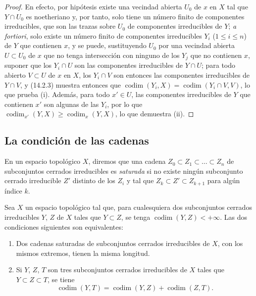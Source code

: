 \begin{proof}
En efecto, por hipótesis existe una vecindad abierta $U_0$ de $x$ en $X$ tal
que $Y\cap U_0$ es noetheriano y, por tanto, solo tiene un número finito de
componentes irreducibles, que son las trazas sobre $U_0$ de componentes
irreducibles de $Y$; \emph{a fortiori}, solo existe un número finito de
componentes irreducibles $Y_i$ ($1\leq i\leq n$) de $Y$ que contienen $x$, y
se puede, sustituyendo $U_0$ por una vecindad abierta $U\subset U_0$ de $x$ que
no tenga intersección con ninguno de los $Y_j$ que no contienen $x$, suponer
que los $Y_i\cap U$ son las componentes irreducibles de $Y\cap U$; para todo
abierto $V\subset U$ de $x$ en $X$, los $Y_i\cap V$ son entonces las
componentes irreducibles de $Y\cap V$, y (14.2.3) muestra entonces que
$\operatorname{codim}(Y_i,X)=\operatorname{codim}(Y_i\cap V,V)$, lo que
prueba (i). Además, para todo $x'\in U$, las componentes irreducibles de $Y$
que contienen $x'$ son algunas de las $Y_i$, por lo que
$\operatorname{codim}_{x'}(Y,X)\geq\operatorname{codim}_x(Y,X)$, lo que
demuestra (ii).
\end{proof}

\subsection{La condición de las cadenas}
\label{subsection:0.14.3-fr}

\begin{env}[14.3.1]
\label{0.14.3.1-fr}
En un espacio topológico $X$, diremos que una cadena
$Z_0\subset Z_1\subset\ldots\subset Z_n$ de subconjuntos cerrados irreducibles es
\emph{saturada} si no existe ningún subconjunto cerrado irreducible $Z'$ distinto
de los $Z_i$ y tal que $Z_k\subset Z'\subset Z_{k+1}$ para algún índice $k$.
\end{env}

\begin{proposition}[14.3.2]
\label{0.14.3.2-fr}
Sea $X$ un espacio topológico tal que, para cualesquiera dos subconjuntos
cerrados irreducibles $Y$, $Z$ de $X$ tales que $Y\subset Z$, se tenga
$\operatorname{codim}(Y,Z)<+\infty$. Las dos condiciones siguientes son
equivalentes:
\begin{enumerate}
  \item[\rm a)] Dos cadenas saturadas de subconjuntos cerrados irreducibles de $X$,
  con los mismos extremos, tienen la misma longitud.
  \item[\rm b)] Si $Y$, $Z$, $T$ son tres subconjuntos cerrados irreducibles de
  $X$ tales que $Y\subset Z\subset T$, se tiene
  \[
    \operatorname{codim}(Y,T)=
    \operatorname{codim}(Y,Z)+\operatorname{codim}(Z,T).
    \tag{14.3.2.1}\label{0.14.3.2.1-fr}
  \]
\end{enumerate}
\end{proposition}

